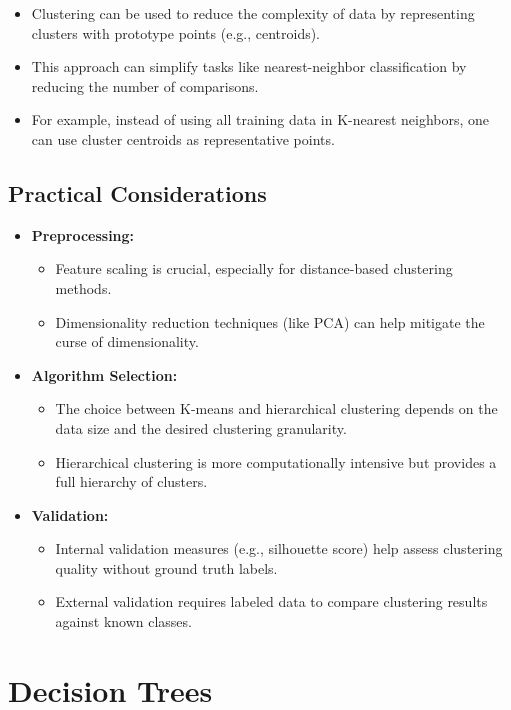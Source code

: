 \documentclass{article}
\begin{document}
\begin{itemize}
    \item Clustering can be used to reduce the complexity of data by representing clusters with prototype points (e.g., centroids).
    \item This approach can simplify tasks like nearest-neighbor classification by reducing the number of comparisons.
    \item For example, instead of using all training data in K-nearest neighbors, one can use cluster centroids as representative points.
\end{itemize}

\subsection{Practical Considerations}

\begin{itemize}
    \item \textbf{Preprocessing:}
    \begin{itemize}
        \item Feature scaling is crucial, especially for distance-based clustering methods.
        \item Dimensionality reduction techniques (like PCA) can help mitigate the curse of dimensionality.
    \end{itemize}
    \item \textbf{Algorithm Selection:}
    \begin{itemize}
        \item The choice between K-means and hierarchical clustering depends on the data size and the desired clustering granularity.
        \item Hierarchical clustering is more computationally intensive but provides a full hierarchy of clusters.
    \end{itemize}
    \item \textbf{Validation:}
    \begin{itemize}
        \item Internal validation measures (e.g., silhouette score) help assess clustering quality without ground truth labels.
        \item External validation requires labeled data to compare clustering results against known classes.
    \end{itemize}
\end{itemize}

\section{Decision Trees}
\end{document}
